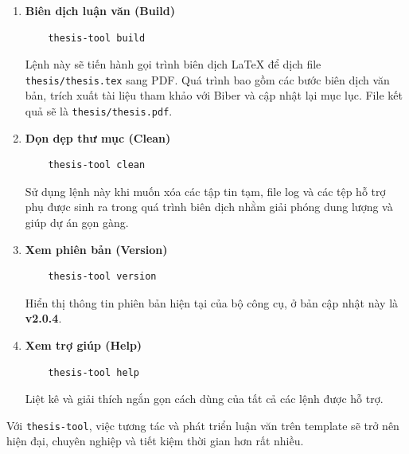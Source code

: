 \begin{enumerate}
    \item \textbf{Biên dịch luận văn (Build)}
    \begin{verbatim}
    thesis-tool build
    \end{verbatim}
    Lệnh này sẽ tiến hành gọi trình biên dịch LaTeX để dịch file \texttt{thesis/thesis.tex} sang PDF. Quá trình bao gồm các bước biên dịch văn bản, trích xuất tài liệu tham khảo với Biber và cập nhật lại mục lục. File kết quả sẽ là \texttt{thesis/thesis.pdf}.

    \item \textbf{Dọn dẹp thư mục (Clean)}
    \begin{verbatim}
    thesis-tool clean
    \end{verbatim}
    Sử dụng lệnh này khi muốn xóa các tập tin tạm, file log và các tệp hỗ trợ phụ được sinh ra trong quá trình biên dịch nhằm giải phóng dung lượng và giúp dự án gọn gàng.

    \item \textbf{Xem phiên bản (Version)}
    \begin{verbatim}
    thesis-tool version
    \end{verbatim}
    Hiển thị thông tin phiên bản hiện tại của bộ công cụ, ở bản cập nhật này là \textbf{v2.0.4}.

    \item \textbf{Xem trợ giúp (Help)}
    \begin{verbatim}
    thesis-tool help
    \end{verbatim}
    Liệt kê và giải thích ngắn gọn cách dùng của tất cả các lệnh được hỗ trợ.
\end{enumerate}

Với \texttt{thesis-tool}, việc tương tác và phát triển luận văn trên template sẽ trở nên hiện đại, chuyên nghiệp và tiết kiệm thời gian hơn rất nhiều.
